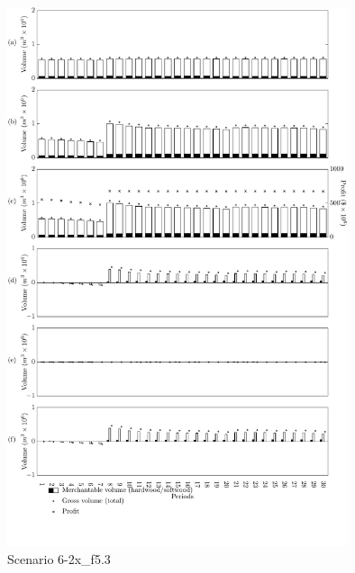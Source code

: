 \begin{figure}[h]
  \centering
  \includegraphics[width=10cm]{images/appendix/s6-2x_test70}
  \caption{Scenario 6-2x\_f5.3}
  \label{fig:s6-2x_test70}
\end{figure}

